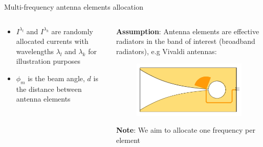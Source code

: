 \documentclass[../main.tex]{subfiles}
\begin{document}
\begin{frame}[t]{Multi-frequency antenna elements allocation}
\begin{columns}[t]
\begin{column}{0.6\textwidth}
\begin{figure}[H]
\end{figure}

\begin{itemize}
    \item $I^{\lambda_{l}}$ and $I^{\lambda_{k}}$  are randomly allocated currents with wavelengths $\lambda_l$ and $\lambda_k$ for illustration purposes
    \item $\phi_{m}$ is the beam angle, $d$ is the distance between antenna elements
\end{itemize}

\end{column}
\begin{column}{0.4\textwidth}
    \textbf{Assumption}:
    Antenna elements are effective radiators in the band of interest (broadband radiators), e.g Vivaldi antennas:

    \begin{figure}[H]
    \begin{adjustbox}{width=0.65\linewidth}
    \includegraphics{pics/vivaldi-print.jpg}
    \end{adjustbox}
    \end{figure}

    \textbf{Note}:
    We aim to allocate one frequency per element
\end{column}
    
\end{columns}

\end{frame}


%
%
\end{document}
